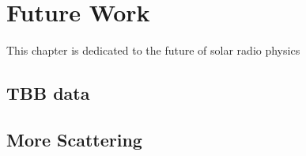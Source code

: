 \doublespacing
\chapter{Future Work}
\label{chap:future}
This chapter is dedicated to the future of solar radio physics
\section{TBB data}
\section{More Scattering}